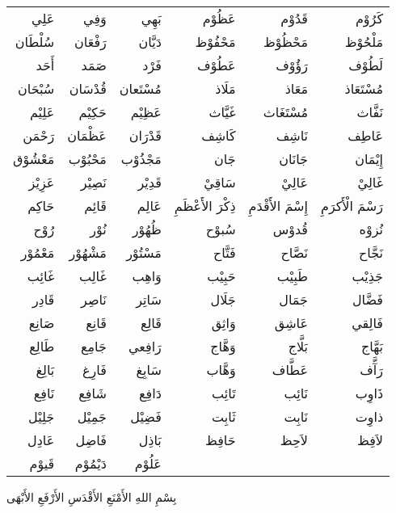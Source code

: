 \documentclass[14pt]{extarticle}
\begin{document}
\begin{hafez}{}{}
  \begin{arab}[voc]
\Huge

\begin{tabular}{|rrr||rrr|}
\hline
عَلِي  &  وَفِي  &  بَهِي & عَظُوْم &  قَدُوْم &  كَرُوْم \\
سُلْطَان  &  رَفْعَان  &  دَيَّان & مَحْفُوْظ &  مَحْظُوْظ &  مَلْحُوْظ \\
أَحَد &  صَمَد &  فَرْد & عَطُوْف &  رَؤُوْف &  لَطُوْف \\
سُبْحَان &  قُدْسَان &  مُسْتَعان & مَلَاذ &  مَعَاذ &  مُسْتَعَاذ \\ \hline
عَلِيْم &  حَكِيْم &  عَظِيْم & غَيَّاث &  مُسْتَغَاث &  نَفَّاث \\
رَحْمَن &  عَظْمَان &  قَدْرَان & كَاشِف &  نَاشِف &  عَاطِف \\
مَعْشُوْق &  مَحْبُوْب &  مَجْذُوْب & جَان &  جَانَان &  إِيْمَان \\
عَزِيْز &  نَصِيْر &  قَدِيْر & سَاقِيْ  &  عَالِيْ  &  غَالِيْ \\ \hline
حَاكِم &  قَائِم &  عَالِم & ذِكْرَ الأَعْظَمِ  &  إِسْمَ الأَقْدَمِ  &  رَسْمَ الْأَكرَمِ \\
رُوْح &  نُوْر &  ظُهُوْر & سُبوْح &  قُدوْس &  نُزوْه \\
مَعْمُوْر &  مَشْهُوْر &  مَسْتُوْر & فَتَّاح &  نَصَّاح &  نَجَّاح \\
غَائِب &  غَالِب &  وَاهِب & حَبِيْب &  طَبِيْب &  جَذِيْب \\ \hline
قَادِر &  نَاصِر &  سَاتِر & جَلَال &  جَمَال &  فَضَّال \\
صَانِع &  قَانِع &  قَالِع & وَاثِق &  عَاشِق &  فَالِقي \\
طَالِع &  جَامِع &  رَافِعي & وَهَّاج &  بَلَّاج &  بَهَّاج \\
بَالِغ &  فَارِغ &  سَابِغ & وَهَّاب &  عَطَّاف &  رَآَّف \\\hline
نَافِع &  شَافِع &  دَافِع & تَائِب &  نَائِب &  ذَاوِب \\
جَلِيْل &  جَمِيْل &  فَضِيْل & ثَابِت &  نَابِت &  ذاوِت \\
عَادِل &  فَاضِل &  بَاذِل & حَافِظ &  لاَحِظ &  لاَفِظ \\
قَيوْم &  دَيْمُوْم &  عَلُوْم & & & \\ \hline
\end{tabular}

\newpage
\LARGE
بِسْمِ اللهِ الأَمْنَعِ الأَقْدَسِ الأَرْفَعِ الأَبْهَى \\


\end{arab}
\end{hafez}
\end{document}
